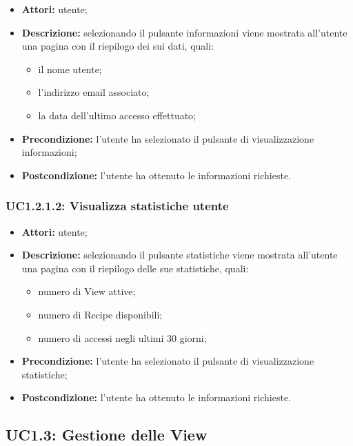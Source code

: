 \begin{itemize}
    \item \textbf{Attori:} utente;
    \item \textbf{Descrizione:} selezionando il pulsante informazioni viene mostrata all'utente una pagina con il riepilogo dei sui dati, quali:
    \begin{itemize}
        \item il nome utente;
        \item l'indirizzo email associato;
        \item la data dell'ultimo accesso effettuato;
    \end{itemize}
    \item \textbf{Precondizione:} l'utente ha selezionato il pulsante di visualizzazione informazioni;
    \item \textbf{Postcondizione:} l'utente ha ottenuto le informazioni richieste.
\end{itemize}

\subsubsection{UC1.2.1.2: Visualizza statistiche utente}

\begin{itemize}
    \item \textbf{Attori:} utente;
    \item \textbf{Descrizione:} selezionando il pulsante statistiche viene mostrata all'utente una pagina con il riepilogo delle sue statistiche, quali:
    \begin{itemize}
        \item numero di View attive;
        \item numero di Recipe disponibili;
        \item numero di accessi negli ultimi 30 giorni;
    \end{itemize}
    \item \textbf{Precondizione:} l'utente ha selezionato il pulsante di visualizzazione statistiche;
    \item \textbf{Postcondizione:} l'utente ha ottenuto le informazioni richieste.
\end{itemize}

\pagebreak
\subsection{UC1.3: Gestione delle View}

